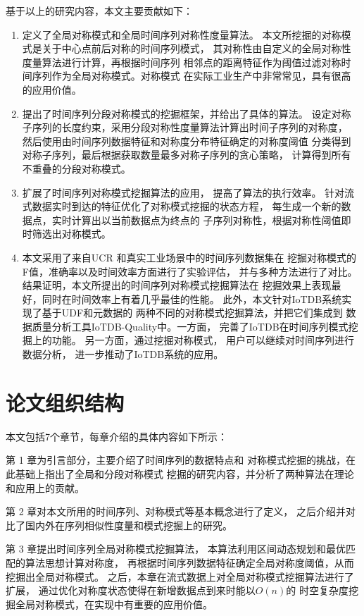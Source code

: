 基于以上的研究内容，本文主要贡献如下：
\begin{enumerate}
\item 定义了全局对称模式和全局时间序列对称性度量算法。
本文所挖掘的对称模式是关于中心点前后对称的时间序列模式，
其对称性由自定义的全局对称性度量算法进行计算，再根据时间序列
相邻点的距离特征作为阈值过滤对称时间序列作为全局对称模式。对称模式
在实际工业生产中非常常见，具有很高的应用价值。
\item 提出了时间序列分段对称模式的挖掘框架，并给出了具体的算法。
设定对称子序列的长度约束，采用分段对称性度量算法计算出时间子序列的对称度，
然后使用由时间序列数据特征和对称度分布特征确定的对称度阈值
分类得到对称子序列，最后根据获取数量最多对称子序列的贪心策略，
计算得到所有不重叠的分段对称模式。
\item 扩展了时间序列对称模式挖掘算法的应用，
提高了算法的执行效率。
针对流式数据实时到达的特征优化了对称模式挖掘的状态方程，
每生成一个新的数据点，实时计算出以当前数据点为终点的
子序列对称性，根据对称性阈值即时筛选出对称模式。
\item 本文采用了来自UCR\cite{DBLP:journals/ieeejas/DauBKYZGRK19}
和真实工业场景中的时间序列数据集在
挖掘对称模式的F值，准确率以及时间效率方面进行了实验评估，
并与多种方法进行了对比。
结果证明，本文所提出的时间序列对称模式挖掘算法在
挖掘效果上表现最好，同时在时间效率上有着几乎最佳的性能。
此外，本文针对IoTDB系统实现了基于UDF和元数据的
两种不同的对称模式挖掘算法，并把它们集成到
数据质量分析工具IoTDB-Quality中。一方面，
完善了IoTDB在时间序列模式挖掘上的功能。
另一方面，通过挖掘对称模式，
用户可以继续对时间序列进行数据分析，
进一步推动了IoTDB系统的应用。
\end{enumerate}

\section{论文组织结构}

本文包括7个章节，每章介绍的具体内容如下所示：

第 1 章为引言部分，主要介绍了时间序列的数据特点和
对称模式挖掘的挑战，在此基础上指出了全局和分段对称模式
挖掘的研究内容，并分析了两种算法在理论和应用上的贡献。

第 2 章对本文所用的时间序列、对称模式等基本概念进行了定义，
之后介绍并对比了国内外在序列相似性度量和模式挖掘上的研究。

第 3 章提出时间序列全局对称模式挖掘算法，
本算法利用区间动态规划和最优匹配的算法思想计算对称度，
再根据时间序列数据特征确定全局对称度阈值，从而挖掘出全局对称模式。
之后，本章在流式数据上对全局对称模式挖掘算法进行了扩展，
通过优化对称度状态使得在新增数据点到来时能以$O(n)$的
时空复杂度挖掘全局对称模式，在实现中有重要的应用价值。

